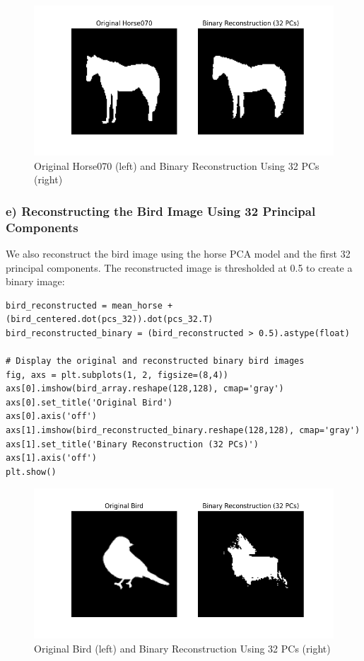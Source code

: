 \documentclass{article}
\begin{document}
\begin{figure}[h]
    \centering
    \includegraphics[width=.8\textwidth]{horse070_reconstruction.png}
    \caption{Original Horse070 (left) and Binary Reconstruction Using 32 PCs (right)}
    \label{fig:horse070_reconstruction}
\end{figure}

\subsubsection*{e) Reconstructing the Bird Image Using 32 Principal Components}

We also reconstruct the bird image using the horse PCA model and the first 32 principal components. The reconstructed image is thresholded at 0.5 to create a binary image:

\begin{verbatim}
bird_reconstructed = mean_horse + (bird_centered.dot(pcs_32)).dot(pcs_32.T)
bird_reconstructed_binary = (bird_reconstructed > 0.5).astype(float)

# Display the original and reconstructed binary bird images
fig, axs = plt.subplots(1, 2, figsize=(8,4))
axs[0].imshow(bird_array.reshape(128,128), cmap='gray')
axs[0].set_title('Original Bird')
axs[0].axis('off')
axs[1].imshow(bird_reconstructed_binary.reshape(128,128), cmap='gray')
axs[1].set_title('Binary Reconstruction (32 PCs)')
axs[1].axis('off')
plt.show()
\end{verbatim}

\begin{figure}[h]
    \centering
    \includegraphics[width=.8\textwidth]{bird_reconstruction.png}
    \caption{Original Bird (left) and Binary Reconstruction Using 32 PCs (right)}
    \label{fig:bird_reconstruction}
\end{figure}
\end{document}
